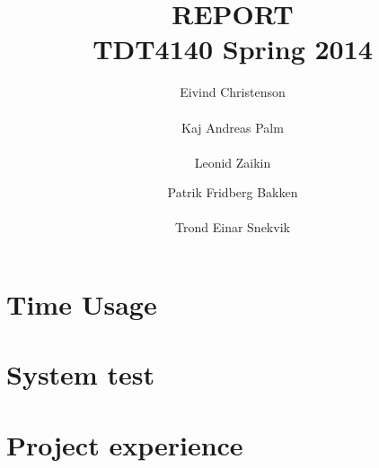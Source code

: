 \documentclass[a4paper]{report}
\author{Eivind Christenson \\\\ Kaj Andreas Palm \\\\Leonid Zaikin\and Patrik Fridberg Bakken\\\\ Trond Einar Snekvik}
\title{\MakeUppercase{\bf Report} \\ \Large{TDT4140 Spring 2014}}
\date{}
\begin{document}
\maketitle


\tableofcontents
\pagestyle{plain} %
\chapter{Time Usage}

\newpage
\chapter{System test}

\newpage
\chapter{Project experience}

\end{document}

